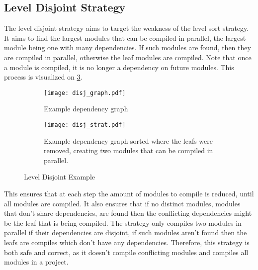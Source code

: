 

\pagebreak
\subsection{Level Disjoint Strategy} \label{sub:design disjoint strategy}

The level disjoint strategy aims to target the weakness of the level sort
strategy. It aims to find the largest modules that can be compiled in parallel,
the largest module being one with many dependencies. If such modules are found,
then they are compiled in parallel, otherwise the leaf modules are compiled.
Note that once a module is compiled, it is no longer a dependency on future
modules. This process is visualized on \cref{subfig:disj strat}.
\begin{figure}[H]
  \begin{subfigure}[t]{0.5\textwidth}
    \centering
    \texttt{[image: disj\_graph.pdf]}
    \caption{Example dependency graph}
    \label{fig:example disj dep graph}
  \end{subfigure} \hfill
  \begin{subfigure}[t]{0.40\textwidth}
    \centering
    \texttt{[image: disj\_strat.pdf]}
    \caption{Example dependency graph sorted where the leafs were removed,
    creating two modules that can be compiled in parallel. }
    \label{fig:example disj strat}
  \end{subfigure}
  \caption{Level Disjoint Example}
  \label{subfig:disj strat}
\end{figure}

This ensures that at each step the amount of modules to compile is reduced,
until all modules are compiled. It also ensures that if no distinct modules,
modules that don't share dependencies, are found then the conflicting
dependencies might be the leaf that is being compiled. The strategy only
compiles two modules in parallel if their dependencies are disjoint, if such
modules aren't found then the leafs are compiles which don't have any
dependencies. Therefore, this strategy is both safe and correct, as it doesn't
compile conflicting modules and compiles all modules in a project.

